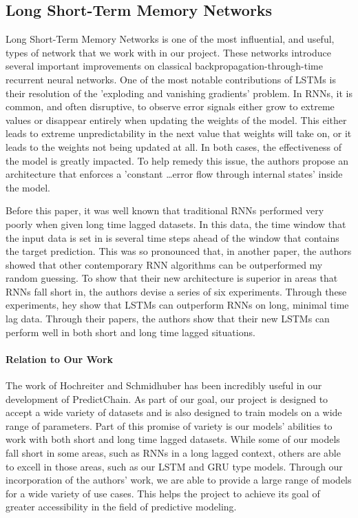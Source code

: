 \documentclass{article}
\begin{document}
    \subsection{Long Short-Term Memory Networks}

    Long Short-Term Memory Networks\cite{LSTM} is one of the most influential, and useful, types of network that we work
    with in our project.  These networks introduce several important improvements on classical backpropagation-through-time
    recurrent neural networks.  One of the most notable contributions of LSTMs is their resolution of the 'exploding
    and vanishing gradients' problem.  In RNNs, it is common, and often disruptive, to observe error signals either
    grow to extreme values or disappear entirely when updating the weights of the model.  This either leads to
    extreme unpredictability in the next value that weights will take on, or it leads to the weights not being
    updated at all. In both cases, the effectiveness of the model is greatly impacted.  To help remedy this issue,
    the authors propose an architecture that enforces a 'constant \ldots error flow through internal states' inside the
    model.

    Before this paper, it was well known that traditional RNNs performed very poorly when given long time lagged
    datasets.   In this data, the time window that the input data is set in is several time steps ahead of the window
    that contains the target prediction.  This was so pronounced that, in another paper\cite{weightGuessing}, the authors
    showed that other contemporary RNN algorithms can be outperformed my random guessing.  To show that their new
    architecture is superior in areas that RNNs fall short in, the authors devise a series of six experiments.
    Through these experiments, hey show that LSTMs can outperform RNNs on long, minimal time lag data.  Through their
    papers, the authors show that their new LSTMs can perform well in both short and long time lagged situations.

    \paragraph{Relation to Our Work}

    The work of Hochreiter and Schmidhuber has been incredibly useful in our development of PredictChain.  As part of
    our goal, our project is designed to accept a wide variety of datasets and is also designed to train models on
    a wide range of parameters.  Part of this promise of variety is our models' abilities to work with both short
    and long time lagged datasets.  While some of our models fall short in some areas, such as RNNs in a long lagged
    context, others are able to excell in those areas, such as our LSTM and GRU type models.  Through our incorporation
    of the authors' work, we are able to provide a large range of models for a wide variety of use cases.  This helps
    the project to achieve its goal of greater accessibility in the field of predictive modeling.
\end{document}
